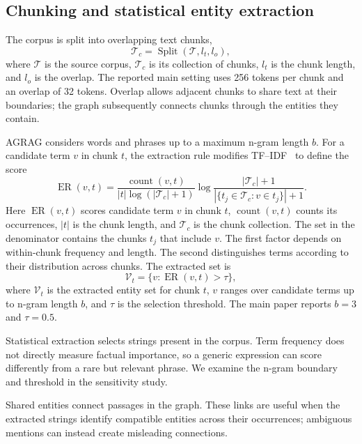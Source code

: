 \subsection{Chunking and statistical entity extraction}
The corpus is split into overlapping text chunks,
\begin{equation}
\mathcal{T}_c=\operatorname{Split}(\mathcal{T},l_t,l_o),
\label{eq:agrag:chunking}
\end{equation}
where $\mathcal T$ is the source corpus, $\mathcal T_c$ is its collection of chunks, $l_t$ is the chunk length, and $l_o$ is the overlap. The reported main setting uses 256 tokens per chunk and an overlap of 32 tokens. Overlap allows adjacent chunks to share text at their boundaries; the graph subsequently connects chunks through the entities they contain.

AGRAG considers words and phrases up to a maximum n-gram length $b$. For a candidate term $v$ in chunk $t$, the extraction rule modifies TF--IDF~\cite{agrag-tfidf} to define the score
\begin{equation}
\operatorname{ER}(v,t)=
\frac{\operatorname{count}(v,t)}{|t|\log(|\mathcal{T}_c|+1)}
\log\frac{|\mathcal{T}_c|+1}{|\{t_j\in\mathcal{T}_c:v\in t_j\}|+1}.
\label{eq:agrag:extraction-score}
\end{equation}
Here $\operatorname{ER}(v,t)$ scores candidate term $v$ in chunk $t$, $\operatorname{count}(v,t)$ counts its occurrences, $|t|$ is the chunk length, and $\mathcal T_c$ is the chunk collection. The set in the denominator contains the chunks $t_j$ that include $v$. The first factor depends on within-chunk frequency and length. The second distinguishes terms according to their distribution across chunks. The extracted set is
\begin{equation}
\mathcal{V}_t=\{v:\operatorname{ER}(v,t)>\tau\},
\label{eq:agrag:entities}
\end{equation}
where $\mathcal V_t$ is the extracted entity set for chunk $t$, $v$ ranges over candidate terms up to n-gram length $b$, and $\tau$ is the selection threshold. The main paper reports $b=3$ and $\tau=0.5$.

Statistical extraction selects strings present in the corpus. Term frequency does not directly measure factual importance, so a generic expression can score differently from a rare but relevant phrase. We examine the n-gram boundary and threshold in the sensitivity study.

Shared entities connect passages in the graph. These links are useful when the extracted strings identify compatible entities across their occurrences; ambiguous mentions can instead create misleading connections.

